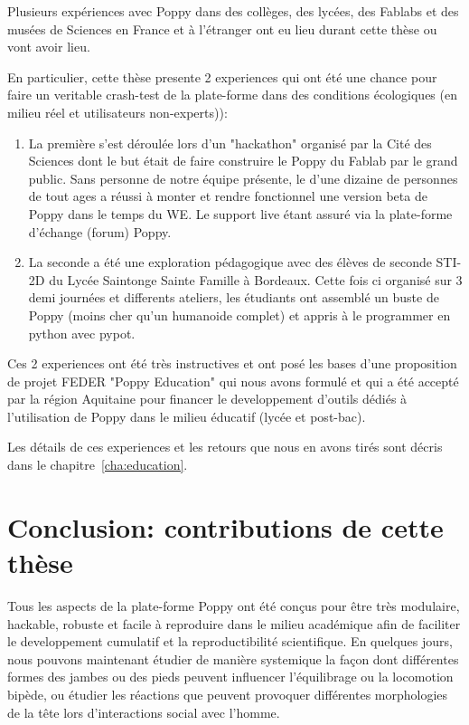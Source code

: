 Plusieurs expériences avec Poppy dans des collèges, des lycées, des Fablabs et des musées de Sciences en France et à l’étranger ont eu lieu durant cette thèse ou vont avoir lieu.

En particulier, cette thèse presente 2 experiences qui ont été une chance pour faire un veritable crash-test de la plate-forme dans des conditions écologiques (en milieu réel et utilisateurs non-experts)):
\begin{enumerate}
    \item La première s'est déroulée lors d'un "hackathon" organisé par la Cité des Sciences dont le but était de faire construire le Poppy du Fablab par le grand public. Sans personne de notre équipe présente, le d'une dizaine de personnes de tout ages a réussi à monter et rendre fonctionnel une version beta de Poppy dans le temps du WE. Le support live étant assuré via la plate-forme d'échange (forum) Poppy.
    \item La seconde a été une exploration pédagogique avec des élèves de seconde STI-2D du Lycée Saintonge Sainte Famille à Bordeaux. Cette fois ci organisé sur 3 demi journées et differents ateliers, les étudiants ont assemblé un buste de Poppy (moins cher qu'un humanoide complet) et appris à le programmer en python avec pypot.
\end{enumerate}


Ces 2 experiences ont été très instructives et ont posé les bases d'une proposition de projet FEDER "Poppy Education" qui nous avons formulé et qui a été accepté par la région Aquitaine pour financer le developpement d'outils dédiés à l'utilisation de Poppy dans le milieu éducatif (lycée et post-bac).

Les détails de ces experiences et les retours que nous en avons tirés sont décris dans le chapitre~\ref{cha:education}.


\section*{Conclusion: contributions de cette thèse} %

Tous les aspects de la plate-forme Poppy ont été conçus pour être très modulaire, hackable, robuste et facile à reproduire dans le milieu académique afin de faciliter le developpement cumulatif et la reproductibilité scientifique. En quelques jours, nous pouvons maintenant étudier de manière systemique la façon dont différentes formes des jambes ou des pieds peuvent influencer l'équilibrage ou la locomotion bipède, ou étudier les réactions que peuvent provoquer différentes morphologies de la tête lors d'interactions social avec l'homme.

